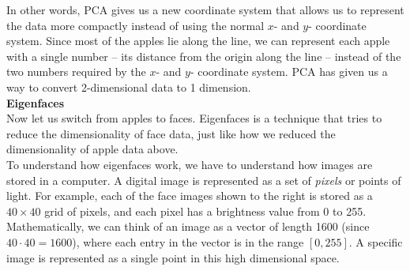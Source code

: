 In other words, PCA gives us a new coordinate system that allows us to represent the data more compactly instead of using the normal $x$- and $y$- coordinate system. Since most of the apples lie along the line, we can represent each apple with a single number -- its distance from the origin along the line -- instead of the two numbers required by the $x$- and $y$- coordinate system. PCA has given us a way to convert 2-dimensional data to 1 dimension. \\


\noindent\textbf{\large Eigenfaces} \\

Now let us switch from apples to faces. Eigenfaces is a technique that tries to reduce the dimensionality of face data, just like how we reduced the dimensionality of apple data above. \\

To understand how eigenfaces work, we have to understand how images are stored in a computer. A digital image is represented as a set of \emph{pixels} or points of light. For example, each of the face images shown to the right is stored as a $40\times 40$ grid of pixels, and each pixel has a brightness value from 0 to 255. Mathematically, we can think of an image as a vector of length 1600 (since $40\cdot 40=1600$), where each entry in the vector is in the range $[0,255]$. A specific image is represented as a single point in this high dimensional space. \\

